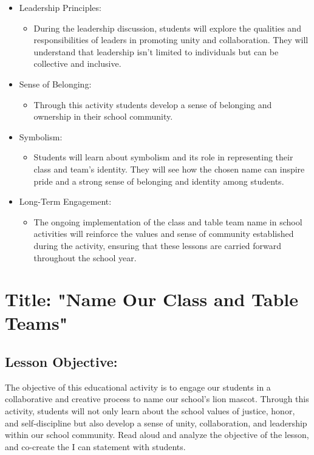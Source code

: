 \documentclass[14pt, letterpaper, twoside]{article}
\begin{document}
\begin{itemize}
\begin{itemize}
			\item Leadership Principles:
				\begin{itemize}
				\item During the leadership discussion, students will explore the qualities and responsibilities of leaders in promoting unity and 							collaboration. They will understand that leadership isn't limited to individuals but can be collective and inclusive.
				\end{itemize}
			\item Sense of Belonging:
				\begin{itemize}
				\item Through this activity students develop a sense of belonging and ownership in their school community.
				\end{itemize}
			\item Symbolism:
				\begin{itemize}
				\item Students will learn about symbolism and its role in representing their class and team's identity. They will see how the chosen name 						can inspire pride and a strong sense of belonging and identity among students.
				\end{itemize}
			\item Long-Term Engagement:
				\begin{itemize}
				\item The ongoing implementation of the class and table team name in school activities will reinforce the values and sense of community 						established during the activity, ensuring that these lessons are carried forward throughout the school year.
				\end{itemize}
			\end{itemize}
	\end{itemize}
	\newpage

\section{Title: "Name Our Class and Table Teams"}
	\subsection{Lesson Objective:}
	
	The objective of this educational activity is to engage our students in a 		collaborative and creative process to name our school's lion mascot. Through 	this activity, students will not only learn about the school values of 			justice, honor, and self-discipline but also develop a sense of unity, 			collaboration, and 	leadership within our school community. Read aloud and 		analyze the objective of the lesson, and co-create the I can statement with 		students.
	
\end{document}
